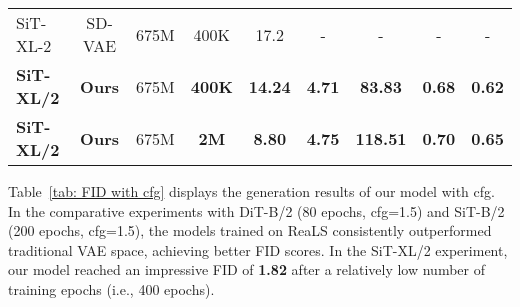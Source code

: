 \begin{table}[ht]
{\begin{tabular}{lcccccccc}
SiT-XL-2          & SD-VAE                  & 675M   & 400K                      & 17.2                    &     -                    & -                      & -                        & -                        \\
\textbf{SiT-XL/2} & \textbf{Ours}           & 675M   & \textbf{400K}             & \textbf{14.24}          & \textbf{4.71}            & \textbf{83.83}         & \textbf{0.68}            & \textbf{0.62}            \\
\textbf{SiT-XL/2} & \textbf{Ours}           & 675M   & \textbf{2M}               &    \textbf{8.80}                     & \textbf{4.75}                         & \textbf{118.51}                       & \textbf{0.70}                         & \textbf{0.65}                        \\ \bottomrule
\end{tabular}
}
\label{tab:FID}
\vspace{-1em}
\end{table}


Table~\ref{tab: FID with cfg} displays the generation results of our model with cfg. In the comparative experiments with DiT-B/2 (80 epochs, cfg=1.5) and SiT-B/2 (200 epochs, cfg=1.5), the models trained on ReaLS consistently outperformed traditional VAE space, achieving better FID scores. In the SiT-XL/2 experiment, our model reached an impressive FID of \textbf{1.82} after a relatively low number of training epochs (i.e., 400 epochs).


